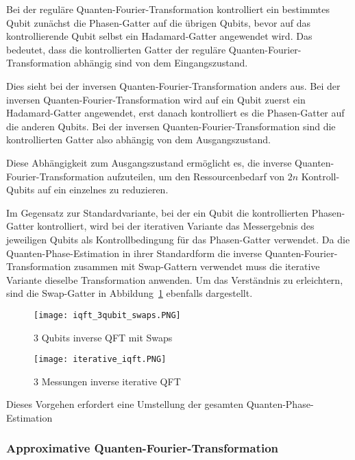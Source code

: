 Bei der reguläre Quanten-Fourier-Transformation kontrolliert ein bestimmtes Qubit zunächst die Phasen-Gatter auf die übrigen Qubits, 
bevor auf das kontrollierende Qubit selbst ein Hadamard-Gatter angewendet wird.
Das bedeutet, dass die kontrollierten Gatter der reguläre Quanten-Fourier-Transformation abhängig sind von dem Eingangszustand.

Dies sieht bei der inversen Quanten-Fourier-Transformation anders aus.
Bei der inversen Quanten-Fourier-Transformation wird auf ein Qubit zuerst ein Hadamard-Gatter angewendet, 
erst danach kontrolliert es die Phasen-Gatter auf die anderen Qubits.
Bei der inversen Quanten-Fourier-Transformation sind die kontrollierten Gatter also abhängig von dem Ausgangszustand.

Diese Abhängigkeit zum Ausgangszustand ermöglicht es, 
die inverse Quanten-Fourier-Transformation aufzuteilen, 
um den Ressourcenbedarf von \(2n\) Kontroll-Qubits auf ein einzelnes zu reduzieren.

Im Gegensatz zur Standardvariante, bei der ein Qubit die kontrollierten Phasen-Gatter kontrolliert, 
wird bei der iterativen Variante das Messergebnis des jeweiligen Qubits als Kontrollbedingung für das Phasen-Gatter verwendet.
Da die Quanten-Phase-Estimation in ihrer Standardform die inverse Quanten-Fourier-Transformation zusammen mit Swap-Gattern verwendet
muss die iterative Variante dieselbe Transformation anwenden.
Um das Verständnis zu erleichtern, 
sind die Swap-Gatter in Abbildung~\ref{fig:iQFTswaps} ebenfalls dargestellt.
\begin{figure} 
  \caption{3 Qubits inverse QFT mit Swaps}
  \label{fig:iQFTswaps}
  \texttt{[image: iqft\_3qubit\_swaps.PNG]}
  \centering
  \end{figure}

\begin{figure} 
  \caption{3 Messungen inverse iterative QFT}
  \label{fig:iterative_iQFT}
  \texttt{[image: iterative\_iqft.PNG]}
  \centering
  \end{figure}
  
Dieses Vorgehen erfordert eine Umstellung der gesamten Quanten-Phase-Estimation


\subsubsection{Approximative Quanten-Fourier-Transformation}


